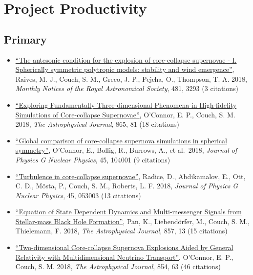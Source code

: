 \documentclass[12pt,titlepage]{article}
\begin{document}
\section{Project Productivity}

\subsection{Primary}

\begin{itemize}
  \item \href{https://ui.adsabs.harvard.edu/#abs/2018MNRAS.481.3293R/abstract}{``The antesonic condition for the explosion of core-collapse supernovae - I. Spherically symmetric polytropic models: stability and wind emergence''}, Raives, M. J., Couch, S. M., Greco, J. P., Pejcha, O., Thompson, T. A. 2018, {\itshape Monthly Notices of the Royal Astronomical Society}, 481, 3293 (3 citations)

  \item \href{https://ui.adsabs.harvard.edu/#abs/2018ApJ...865...81O/abstract}{``Exploring Fundamentally Three-dimensional Phenomena in High-fidelity Simulations of Core-collapse Supernovae''}, O'Connor, E. P., Couch, S. M. 2018, {\itshape The Astrophysical Journal}, 865, 81 (18 citations)
  
  \item \href{https://ui.adsabs.harvard.edu/#abs/2018JPhG...45j4001O/abstract}{``Global comparison of core-collapse supernova simulations in spherical symmetry''}, O'Connor, E., Bollig, R., Burrows, A., et al.\ 2018, {\itshape Journal of Physics G Nuclear Physics}, 45, 104001 (9 citations)
  
  \item \href{https://ui.adsabs.harvard.edu/#abs/2018JPhG...45e3003R/abstract}{``Turbulence in core-collapse supernovae''}, Radice, D., Abdikamalov, E., Ott, C. D., M\"osta, P., Couch, S. M., Roberts, L. F. 2018, {\itshape Journal of Physics G Nuclear Physics}, 45, 053003 (13 citations)
  
  \item \href{https://ui.adsabs.harvard.edu/#abs/2018ApJ...857...13P/abstract}{``Equation of State Dependent Dynamics and Multi-messenger Signals from Stellar-mass Black Hole Formation''}, Pan, K., Liebendörfer, M., Couch, S. M., Thielemann, F. 2018, {\itshape The Astrophysical Journal}, 857, 13 (15 citations)
  
  \item \href{https://ui.adsabs.harvard.edu/#abs/2018ApJ...854...63O/abstract}{``Two-dimensional Core-collapse Supernova Explosions Aided by General Relativity with Multidimensional Neutrino Transport''}, O'Connor, E. P., Couch, S. M. 2018, {\itshape The Astrophysical Journal}, 854, 63 (46 citations)
\end{itemize}
\end{document}
